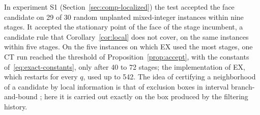 In experiment S1 (Section~\ref{sec:comp-localized}) the test accepted the
face candidate on 29 of 30 random unplanted mixed-integer instances within
nine stages. It accepted the stationary point of the face of the stage
incumbent, a candidate rule that Corollary~\ref{cor:local} does not cover, on
the same instances within five stages. On the five instances on which EX
used the most stages, one CT run reached the threshold of
Proposition~\ref{prop:accept}, with the constants
of~\eqref{eq:exact-constants}, only after 40 to 72 stages; the
implementation of EX, which restarts for every $q$, used up to 542. The idea
of certifying a neighborhood of a candidate by local information is that of
exclusion boxes in interval branch-and-bound \cite{Neumaier2004}; here it is
carried out exactly on the box produced by the filtering history.
